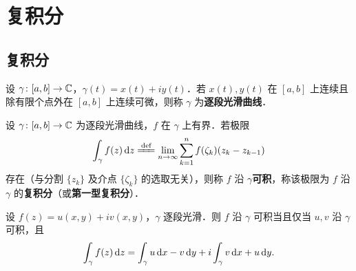 \documentclass[12pt, a4paper, oneside, UTF8]{ctexbook}
\begin{document}
%
\else
\fi
\chapter{复积分}

\section{复积分}

\begin{definition}[逐段光滑曲线]
设 $\gamma\colon [a,b]\to\mathbb{C}$，$\gamma(t)=x(t)+iy(t)$．若 $x(t),y(t)$ 在 $[a,b]$ 上连续且除有限个点外在 $[a,b]$ 上连续可微，则称 $\gamma$ 为\textbf{逐段光滑曲线}．
\end{definition}

\begin{definition}[复积分]
设 $\gamma\colon [a,b]\to\mathbb{C}$ 为逐段光滑曲线，$f$ 在 $\gamma$ 上有界．若极限
\[
\int_\gamma f(z)\,\d z \defeq \lim_{n\to\infty}\sum_{k=1}^{n}f(\zeta_k)(z_k-z_{k-1})
\]
存在（与分割 $\{z_k\}$ 及介点 $\{\zeta_k\}$ 的选取无关），则称 $f$ 沿 $\gamma$\textbf{可积}，称该极限为 $f$ 沿 $\gamma$ 的\textbf{复积分}（或\textbf{第一型复积分}）．
\end{definition}

\begin{theorem}[复积分的等价形式]
设 $f(z)=u(x,y)+iv(x,y)$，$\gamma$ 逐段光滑．则 $f$ 沿 $\gamma$ 可积当且仅当 $u,v$ 沿 $\gamma$ 可积，且
\[
\int_\gamma f(z)\,\mathrm{d} z = \int_\gamma u\,\mathrm{d} x - v\,\mathrm{d} y + i\int_\gamma v\,\mathrm{d} x + u\,\mathrm{d} y.
\]
\end{theorem}
\end{document}
